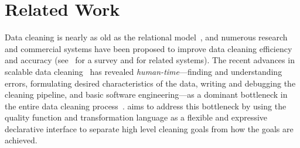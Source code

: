\section{Related Work}





Data cleaning is nearly as old as the relational model~\cite{codd1970relational}, and numerous research and  commercial systems have been proposed to improve data cleaning efficiency and accuracy (see~\cite{rahm2000data} for a survey and  for related systems).
The recent advances in scalable data cleaning~\cite{wang1999sample, DBLP:journals/debu/KrishnanWFGKM015, khayyat2015bigdansing, altowim2014progressive} has revealed {\it human-time}---finding and understanding errors, formulating desired characteristics of the data, writing and debugging the cleaning pipeline, and basic software engineering---as a dominant bottleneck in the entire data cleaning process~\cite{krishnan2016hilda}.  
\sys aims to address this bottleneck by using the quality function and transformation language as a flexible and expressive declarative interface to separate high level cleaning goals from how the goals are achieved.   



